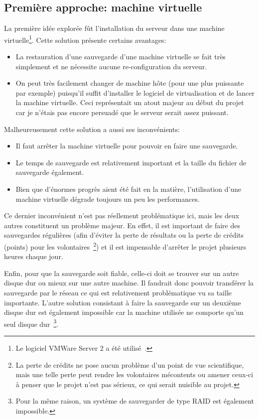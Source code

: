 \documentclass[a4paper, 11pt]{report}
\begin{document}
\subsection{Première approche: machine virtuelle}
La première idée explorée fût l'installation du serveur dans une machine virtuelle\footnote{Le logiciel VMWare Server 2 a été utilisé~\cite{VMWARE}.}.
Cette solution présente certains avantages:
\begin{itemize}
\item La restauration d'une sauvegarde d'une machine virtuelle se fait très simplement et ne nécessite aucune re-configuration du serveur.
\item On peut très facilement changer de machine hôte (pour une plus puissante par exemple) puisqu'il suffit d'installer le logiciel de virtualisation et de lancer la machine virtuelle. Ceci représentait un atout majeur au début du projet car je n'étais pas encore persuadé que le serveur serait assez puissant.
\end{itemize}
Malheureusement cette solution a aussi ses inconvénients:
\begin{itemize}
\item Il faut arrêter la machine virtuelle pour pouvoir en faire une sauvegarde.
\item Le temps de sauvegarde est relativement important et la taille du fichier de sauvegarde également.
\item Bien que d'énormes progrès aient été fait en la matière, l'utilisation d'une machine virtuelle dégrade toujours un peu les performances.
\end{itemize}
Ce dernier inconvénient n'est pas réellement problématique ici, mais les deux autres constituent un problème majeur. En effet, il est important de faire des sauvegardes régulières (afin d'éviter la perte de résultats ou la perte de crédits (points) pour les volontaires~\footnote{La perte de crédits ne pose aucun problème d'un point de vue scientifique, mais une telle perte peut rendre les volontaires mécontents ou amener ceux-ci à penser que le projet n'est pas sérieux, ce qui serait nuisible au projet.}) et il est impensable d'arrêter le projet plusieurs heures chaque jour.

Enfin, pour que la sauvegarde soit fiable, celle-ci doit se trouver sur un autre disque dur ou mieux sur une autre machine. Il faudrait donc pouvoir transférer la sauvegarde par le réseau ce qui est relativement problématique vu sa taille importante. L'autre solution consistant à faire la sauvegarde sur un deuxième disque dur est également impossible car la machine utilisée ne comporte qu'un seul disque dur~\footnote{Pour la même raison, un système de sauvegarder de type RAID est également impossible.}. 
\end{document}

